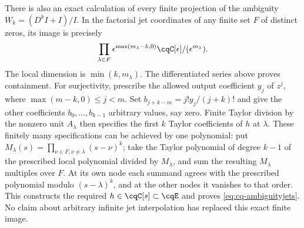 There is also an exact calculation of every finite projection of
the ambiguity $W_k=(D^kI+I)/I$. In the factorial jet coordinates
of any finite set $F$ of distinct zeros, its image is precisely
\begin{equation}\label{eq:cq-ambiguityjets}
 \prod_{\lambda\in F}
 \epsilon^{\max(m_\lambda-k,0)}
       \cqC[\epsilon]/(\epsilon^{m_\lambda}).
\end{equation}
The local dimension is $\min(k,m_\lambda)$. The differentiated
series above proves containment. For surjectivity, prescribe the
allowed output coefficient $y_j$ of $z^j$, where
$\max(m-k,0)\leq j<m$. Set
$b_{j+k-m}=j!y_j/(j+k)!$ and give the other coefficients
$b_0,\ldots,b_{k-1}$ arbitrary values, say zero. Finite Taylor
division by the nonzero unit $A_\lambda$ then specifies the first
$k$ Taylor coefficients of $h$ at $\lambda$.
These finitely many specifications can be achieved by one polynomial:
put $M_\lambda(s)=\prod_{\nu\in F,\nu\ne\lambda}(s-\nu)^k$;
take the Taylor polynomial of degree $k-1$ of the prescribed local
polynomial divided by $M_\lambda$, and sum the resulting
$M_\lambda$ multiples over $F$. At its own node each summand
agrees with the prescribed polynomial modulo $(s-\lambda)^k$,
and at the other nodes it vanishes to that order. This constructs
the required $h\in\cqC[s]\subset\cqE$ and proves
\eqref{eq:cq-ambiguityjets}. No claim about arbitrary infinite jet
interpolation has replaced this exact finite image.

